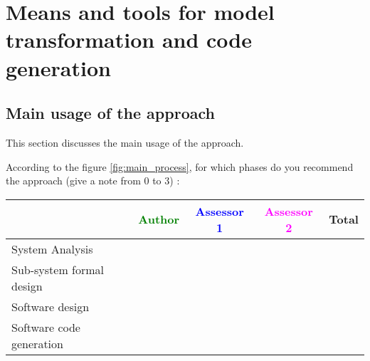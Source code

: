 \chapter{Means and tools for model transformation and code generation}
\label{sec:transformation}


\begin{comment}
MPD : Todo

The sequel is let as an example is this early version.

Criteria to discuss here are those which concerns means and tools to model transformation and code generation
\end{comment}


\section{Main usage of the approach}
\label{main_usage}
This section discusses the main usage of the approach.

According to the figure \ref{fig:main_process}, for which phases do you recommend the approach (give a note from 0 to  3) :

\begin{tabular}{|l | c | c | c | c|}
\hline
& \textcolor{green}{Author} & \textcolor{blue}{Assessor 1} & \textcolor{magenta}{Assessor 2} & Total \\
\hline 
System Analysis & & & &  \\
\hline
Sub-system formal design & & & & \\
\hline
Software design & & & & \\
\hline
Software code generation & & & & \\
\hline
\end{tabular}
